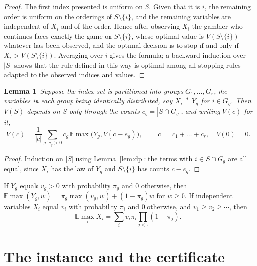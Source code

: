 \documentclass[11pt]{amsart}
\newtheorem{lemma}[theorem]{Lemma}
\theoremstyle{remark}\newtheorem{remark}[theorem]{Remark}
\newcommand{\E}{\mathbb{E}}
\begin{document}
\begin{proof}
The first index presented is uniform on $S$. Given that it is $i$, the remaining order is uniform on the orderings of
$S\setminus\{i\}$, and the remaining variables are independent of $X_i$ and of the order. Hence after observing $X_i$
the gambler who continues faces exactly the game on $S\setminus\{i\}$, whose optimal value is $V(S\setminus\{i\})$
whatever has been observed, and the optimal decision is to stop if and only if $X_i>V(S\setminus\{i\})$. Averaging over
$i$ gives the formula; a backward induction over $|S|$ shows that the rule defined in this way is optimal among all
stopping rules adapted to the observed indices and values.
\end{proof}

\begin{lemma}\label{lem:counts}
Suppose the index set is partitioned into groups $G_1,\dots,G_r$, the variables in each group being identically
distributed, say $X_i\overset{d}{=}Y_g$ for $i\in G_g$. Then $V(S)$ depends on $S$ only through the counts
$c_g=|S\cap G_g|$, and writing $V(c)$ for it,
\[
V(c)=\frac1{|c|}\sum_{g:\,c_g>0}c_g\,\E\max\bigl(Y_g,V(c-e_g)\bigr),\qquad |c|=c_1+\dots+c_r,\quad V(0)=0 .
\]
\end{lemma}

\begin{proof}
Induction on $|S|$ using Lemma~\ref{lem:dp}: the terms with $i\in S\cap G_g$ are all equal, since $X_i$ has the law of
$Y_g$ and $S\setminus\{i\}$ has counts $c-e_g$.
\end{proof}

If $Y_g$ equals $v_g>0$ with probability $\pi_g$ and $0$ otherwise, then
$\E\max(Y_g,w)=\pi_g\max(v_g,w)+(1-\pi_g)w$ for $w\ge0$. If independent variables $X_i$ equal $v_i$ with
probability $\pi_i$ and $0$ otherwise, and $v_1\ge v_2\ge\cdots$, then
\begin{equation}\label{eq:emax}
\E\max_i X_i=\sum_i v_i\pi_i\prod_{j<i}(1-\pi_j).
\end{equation}

\section{The instance and the certificate}\label{sec:cert}
\end{document}

